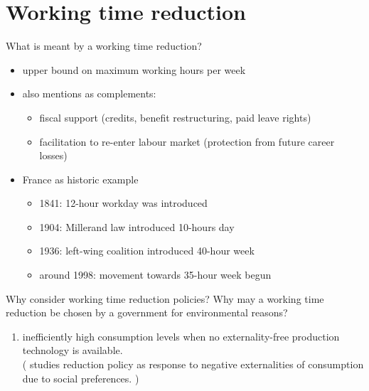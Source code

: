 \documentclass[11pt,aspectratio=169]{beamer}
\begin{document}
\section{Working time reduction}
\begin{frame}{What is meant by a working time reduction?}
	\begin{itemize}
		\item upper bound on maximum working hours per week
	\item \cite{Pullinger2014WorkingDesign} also mentions as complements:
	\begin{itemize}
\item fiscal support (credits, benefit restructuring, paid leave rights)
\item  facilitation to re-enter labour market (protection from future career losses)
	\end{itemize}
		\item France as historic example \citep[based on][]{Alvarez-Cuadrado2007EnvyHours}
		\begin{itemize}
\item 1841: 12-hour workday was introduced
\item 1904: Millerand law introduced 10-hours day
\item 1936: left-wing coalition introduced 40-hour week
\item around 1998: movement towards 35-hour week begun
		\end{itemize}
	\end{itemize}
	
\end{frame}



\begin{frame}{Why consider working time reduction policies?}
	Why may a working time reduction be chosen by a government for environmental reasons? 
\begin{enumerate}
\item inefficiently high consumption levels when no externality-free production technology is available.\\
(\cite{Alvarez-Cuadrado2007EnvyHours} studies reduction policy as response to negative externalities of consumption due to social preferences.  
) 
\end{enumerate}
\end{frame}
\end{document}
